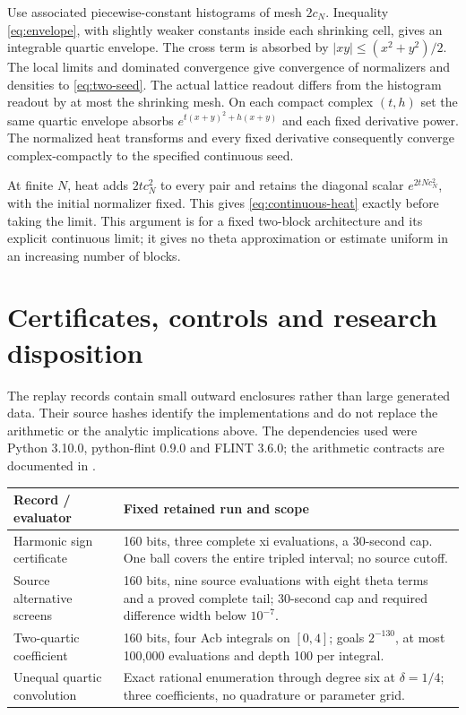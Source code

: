 \documentclass[11pt]{article}
\theoremstyle{remark}
\numberwithin{equation}{section}
\begin{document}
Use associated piecewise-constant histograms of mesh \(2c_N\).
Inequality \eqref{eq:envelope}, with slightly weaker constants inside
each shrinking cell, gives an integrable quartic envelope.
The cross term is absorbed by \(|xy|\le(x^2+y^2)/2\).
The local limits and dominated convergence give convergence of
normalizers and densities to \eqref{eq:two-seed}. The actual lattice
readout differs from the histogram readout by at most the shrinking
mesh. On each compact complex \((t,h)\) set the same quartic envelope
absorbs \(e^{t(x+y)^2+h(x+y)}\) and each fixed derivative power.
The normalized heat transforms and every fixed derivative consequently
converge complex-compactly to the specified continuous seed.

At finite \(N\), heat adds \(2tc_N^2\) to every pair and retains the
diagonal scalar \(e^{2tNc_N^2}\), with the initial normalizer fixed.
This gives \eqref{eq:continuous-heat} exactly before taking the limit.
This argument is for a fixed two-block architecture and its explicit
continuous limit; it gives no theta approximation or estimate uniform
in an increasing number of blocks.

\section{Certificates, controls and research disposition}\label{sec:records}

The replay records contain small outward enclosures rather than large
generated data. Their source hashes identify the implementations and do
not replace the arithmetic or the analytic implications above.
The dependencies used were Python 3.10.0, python-flint 0.9.0 and
FLINT 3.6.0; the arithmetic contracts are documented in \cite{flint}.

\begin{center}\small
\begin{tabularx}{\textwidth}{@{}p{}X@{}}
\toprule
Record / evaluator & Fixed retained run and scope\\
\midrule
Harmonic sign certificate &
160 bits, three complete xi evaluations, a 30-second cap.
One ball covers the entire tripled interval; no source cutoff.\\
Source alternative screens &
160 bits, nine source evaluations with eight theta terms and a proved
complete tail; 30-second cap and required difference width below \(10^{-7}\).\\
Two-quartic coefficient &
160 bits, four Acb integrals on \([0,4]\); goals \(2^{-130}\), at most
100,000 evaluations and depth 100 per integral.\\
Unequal quartic convolution &
Exact rational enumeration through degree six at \(\delta=1/4\);
three coefficients, no quadrature or parameter grid.\\
\bottomrule
\end{tabularx}
\end{center}
\end{document}
